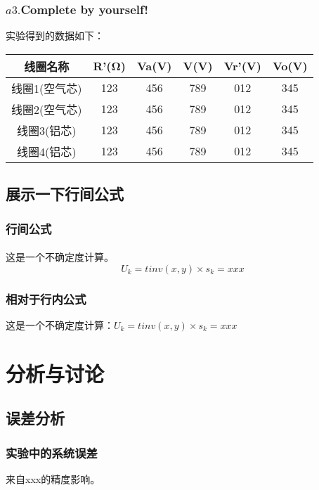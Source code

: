 \documentclass[UTF8]{ctexart}
\begin{document}
\subsubsection{$a3. $Complete by yourself!}
实验得到的数据如下：

\begin{center}
\begin{tabular}{|c|c|c|c|c|c|}
 \hline
线圈名称 & R'(Ω) & Va(V) & V(V) & Vr'(V) & Vo(V)\\
 \hline
线圈1(空气芯) & 123 & 456 & 789 & 012 & 345\\
 \hline
线圈2(空气芯) & 123 & 456 & 789 & 012 & 345\\
 \hline
线圈3(铝芯) & 123 & 456 & 789 & 012 & 345\\
 \hline
线圈4(铝芯) & 123 & 456 & 789 & 012 & 345\\
 \hline
\end{tabular}
\end{center}

\subsection{展示一下行间公式}
\subsubsection{行间公式}
\paragraph{}这是一个不确定度计算。
\[
U_k=tinv(x,y)×s_k=xxx
\]
\subsubsection{相对于行内公式}
这是一个不确定度计算：$U_k=tinv(x,y)×s_k=xxx$


\section{分析与讨论}

\subsection{误差分析}

\subsubsection{实验中的系统误差}
来自xxx的精度影响。
\end{document}
